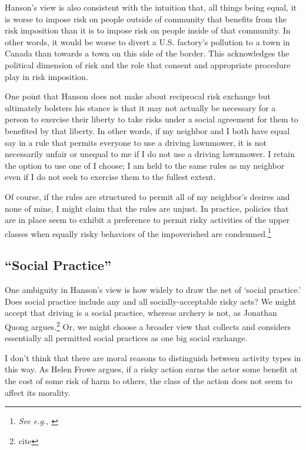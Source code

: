 Hanson’s view is also consistent with the intuition that, all things being
equal, it is worse to impose risk on people outside of community that benefits
from the risk imposition than it is to impose risk on people inside of that
community. In other words, it would be worse to divert a U.S. factory’s
pollution to a town in Canada than towards a town on this side of the border.
This acknowledges the political dimension of risk and the role that consent and
appropriate procedure play in risk imposition.

One point that Hanson does not make about reciprocal risk exchange but
ultimately bolsters his stance is that it may not actually be necessary for a
person to exercise their liberty to take risks under a social agreement for
them to benefited by that liberty. In other words, if my neighbor and I both
have equal say in a rule that permits everyone to use a driving lawnmower, it
is not necessarily unfair or unequal to me if I do not use a driving lawnmower.
I retain the option to use one of I choose; I am held to the same rules as my
neighbor even if I do not seek to exercise them to the fullest extent.

Of course, if the rules are structured to permit all of my neighbor’s desires
and none of mine, I might claim that the rules are unjust. In practice,
policies that are in place seem to exhibit a preference to permit risky
activities of the upper classes when equally risky behaviors of the
impoverished are condemned.\footnote{\emph{See e.g.,} \cite[Ch. 1]{pl}}

\subsection{“Social Practice”}

One ambiguity in Hanson’s view is how widely to draw the net of ‘social
practice.’ Does social practice include any and all socially-acceptable risky
acts? We might accept that driving is a social practice, whereas archery is
not, as Jonathan Quong argues.\footnote{cite} Or, we might choose a broader
view that collects and considers essentially all permitted social practices as
one big social exchange.

I don’t think that there are moral reasons to distinguish between activity
types in this way. As Helen Frowe argues, if a risky action earns the actor
some benefit at the cost of some risk of harm to others, the class of the
action does not seem to affect its morality.\autocite[9]{frowe}

